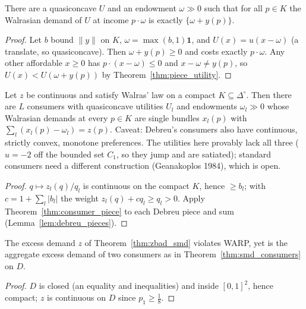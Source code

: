 \begin{theorem}
\label{thm:consumer_piece}
\leanok
{}
There are a quasiconcave $U$ and an endowment $\omega \gg 0$ such that for all $p \in K$ the Walrasian demand of $U$ at
income $p \cdot \omega$ is exactly $\{\omega + y(p)\}$.
\end{theorem}
\begin{proof}
\leanok
Let $b$ bound $\|y\|$ on $K$, $\omega = \max(b, 1)\mathbf{1}$, and $U(x) = u(x - \omega)$ (a translate, so quasiconcave). Then
$\omega + y(p) \ge 0$ and costs exactly $p \cdot \omega$. Any other affordable $x \ge 0$ has $p\cdot(x - \omega) \le 0$ and
$x - \omega \ne y(p)$, so $U(x) < U(\omega + y(p))$ by Theorem~\ref{thm:piece_utility}.
\end{proof}

\begin{theorem}
\label{thm:smd_consumers}
\leanok
{}
Let $z$ be continuous and satisfy Walras' law on a compact $K \subseteq \Delta^\circ$. Then there are $L$ consumers with
quasiconcave utilities $U_l$ and endowments $\omega_l \gg 0$ whose Walrasian demands at every $p \in K$ are single bundles
$x_l(p)$ with $\sum_l (x_l(p) - \omega_l) = z(p)$. Caveat: Debreu's consumers also have continuous, strictly convex, monotone
preferences. The utilities here provably lack all three ($u = -2$ off the bounded set $C_1$, so they jump and are satiated);
standard consumers need a different construction (Geanakoplos 1984), which is open.
\end{theorem}
\begin{proof}
\leanok
$q \mapsto z_l(q)/q_l$ is continuous on the compact $K$, hence $\ge b_l$; with $c = 1 + \sum_l |b_l|$ the weight
$z_l(q) + c q_l \ge q_l > 0$. Apply Theorem~\ref{thm:consumer_piece} to each Debreu piece and sum
(Lemma~\ref{lem:debreu_pieces}).
\end{proof}

\begin{theorem}
\label{thm:zbad_consumers}
\leanok
{}
The excess demand $z$ of Theorem~\ref{thm:zbad_smd} violates WARP, yet is the aggregate excess demand of two consumers as in
Theorem~\ref{thm:smd_consumers} on $D$.
\end{theorem}
\begin{proof}
\leanok
$D$ is closed (an equality and inequalities) and inside $[0,1]^2$, hence compact; $z$ is continuous on $D$ since $p_1 \ge \frac18$.
\end{proof}

